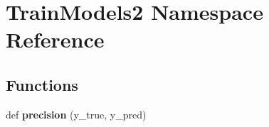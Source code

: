 \hypertarget{namespaceTrainModels2}{}\section{Train\+Models2 Namespace Reference}
\label{namespaceTrainModels2}
\subsection*{Functions}
\begin{DoxyCompactItemize}
\item 
\mbox{\label{namespaceTrainModels2_afb5abaa36264a0a02f9ba9878145d2cb}} 
def {\bfseries precision} (y\+\_\+true, y\+\_\+pred)
\end{DoxyCompactItemize}

